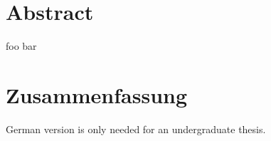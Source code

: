 \chapter*{Abstract}
foo bar

\chapter*{Zusammenfassung}
German version is only needed for an undergraduate thesis.
